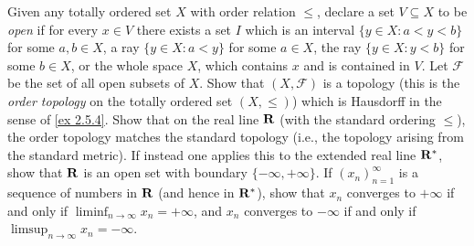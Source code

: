 \begin{exercise}\label{ex 2.5.5}
  Given any totally ordered set \(X\) with order relation \(\leq\), declare a set \(V \subseteq X\) to be \emph{open} if for every \(x \in V\) there exists a set \(I\) which is an interval \(\{y \in X : a < y < b\}\) for some \(a, b \in X\), a ray \(\{y \in X : a < y\}\) for some \(a \in X\), the ray \(\{y \in X : y < b\}\) for some \(b \in X\), or the whole space \(X\), which contains \(x\) and is contained in \(V\).
  Let \(\mathcal{F}\) be the set of all open subsets of \(X\).
  Show that \((X, \mathcal{F})\) is a topology (this is the \emph{order topology} on the totally ordered set \((X, \leq)\)) which is Hausdorff in the sense of \cref{ex 2.5.4}.
  Show that on the real line \(\mathbf{R}\) (with the standard ordering \(\leq\)), the order topology matches the standard topology (i.e., the topology arising from the standard metric).
  If instead one applies this to the extended real line \(\mathbf{R}^*\), show that \(\mathbf{R}\) is an open set with boundary \(\{-\infty, +\infty\}\).
  If \((x_n)_{n = 1}^\infty\) is a sequence of numbers in \(\mathbf{R}\) (and hence in \(\mathbf{R}^*\)), show that \(x_n\) converges to \(+\infty\) if and only if \(\liminf_{n \to \infty} x_n = +\infty\), and \(x_n\) converges to \(-\infty\) if and only if \(\limsup_{n \to \infty} x_n = -\infty\).
\end{exercise}

